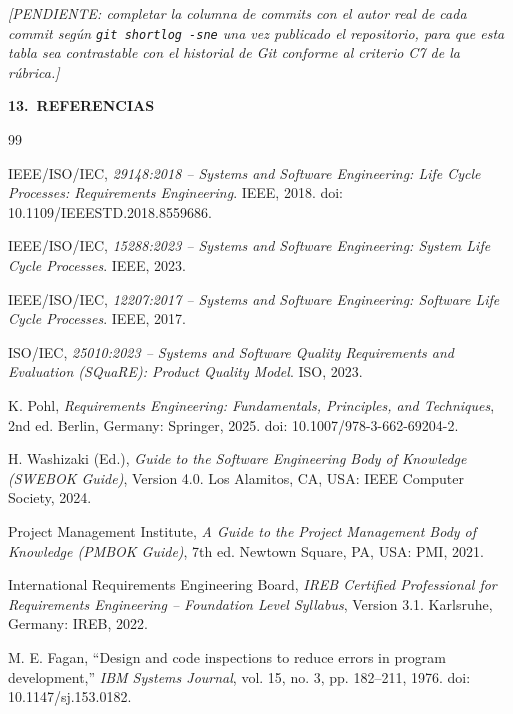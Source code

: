 \documentclass[11pt,a4paper]{article}
\newcommand{\seccion}[2]{%
  \vspace{0.6cm}
  \noindent
  {\color{white}\colorbox{uteqverde}{%
    \parbox[c][1.05cm]{\dimexpr\textwidth-16pt\relax}{%
      \hspace{6pt}\textbf{\large #1\ #2}%
    }%
  }}%
  \vspace{0.35cm}
  \par
}
\begin{document}
\textcolor{uteqgris}{\textit{[PENDIENTE: completar la columna de commits con el
autor real de cada commit según \texttt{git shortlog -sne} una vez publicado
el repositorio, para que esta tabla sea contrastable con el historial de Git
conforme al criterio C7 de la rúbrica.]}}

\seccion{13.}{REFERENCIAS}

\renewcommand{\refname}{\vspace{-2.2em}}
\begin{thebibliography}{99}

 IEEE/ISO/IEC, \textit{29148:2018 -- Systems and Software
Engineering: Life Cycle Processes: Requirements Engineering}. IEEE, 2018.
doi: 10.1109/IEEESTD.2018.8559686.

 IEEE/ISO/IEC, \textit{15288:2023 -- Systems and Software
Engineering: System Life Cycle Processes}. IEEE, 2023.

 IEEE/ISO/IEC, \textit{12207:2017 -- Systems and Software
Engineering: Software Life Cycle Processes}. IEEE, 2017.

 ISO/IEC, \textit{25010:2023 -- Systems and Software Quality
Requirements and Evaluation (SQuaRE): Product Quality Model}. ISO, 2023.

 K. Pohl, \textit{Requirements Engineering: Fundamentals,
Principles, and Techniques}, 2nd ed. Berlin, Germany: Springer, 2025.
doi: 10.1007/978-3-662-69204-2.

 H. Washizaki (Ed.), \textit{Guide to the Software
Engineering Body of Knowledge (SWEBOK Guide)}, Version 4.0. Los Alamitos, CA,
USA: IEEE Computer Society, 2024.

 Project Management Institute, \textit{A Guide to the
Project Management Body of Knowledge (PMBOK Guide)}, 7th ed. Newtown Square,
PA, USA: PMI, 2021.

 International Requirements Engineering Board, \textit{IREB
Certified Professional for Requirements Engineering -- Foundation Level
Syllabus}, Version 3.1. Karlsruhe, Germany: IREB, 2022.

 M. E. Fagan, ``Design and code inspections to reduce
errors in program development,'' \textit{IBM Systems Journal}, vol. 15,
no. 3, pp. 182--211, 1976. doi: 10.1147/sj.153.0182.


\end{thebibliography}
\end{document}
